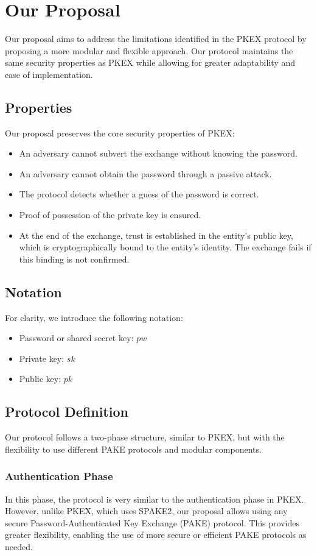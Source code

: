 \section{Our Proposal}

Our proposal aims to address the limitations identified in the PKEX
protocol by proposing a more modular and flexible approach. Our protocol
maintains the same security properties as PKEX while allowing for greater
adaptability and ease of implementation.

\subsection{Properties}
Our proposal preserves the core security properties of PKEX:
\begin{itemize}
	\item An adversary cannot subvert the exchange without knowing the password.
	\item An adversary cannot obtain the password through a passive attack.
	\item The protocol detects whether a guess of the password is correct.
	\item Proof of possession of the private key is ensured.
	\item At the end of the exchange, trust is established in the entity's
		public key, which is cryptographically bound to the entity's identity.
		The exchange fails if this binding is not confirmed.
\end{itemize}

\subsection{Notation}
For clarity, we introduce the following notation:
\begin{itemize}
	\item Password or shared secret key: \( pw \)
	\item Private key: \( sk \)
	\item Public key: \( pk \)
\end{itemize}

\subsection{Protocol Definition}
Our protocol follows a two-phase structure, similar to PKEX, but with the
flexibility to use different PAKE protocols and modular components.

\subsubsection{Authentication Phase}
In this phase, the protocol is very similar to the authentication phase in
PKEX. However, unlike PKEX, which uses SPAKE2, our proposal allows using 
any secure Password-Authenticated Key Exchange (PAKE) protocol. This provides
greater flexibility, enabling the use of more secure or efficient PAKE
protocols as needed. 

